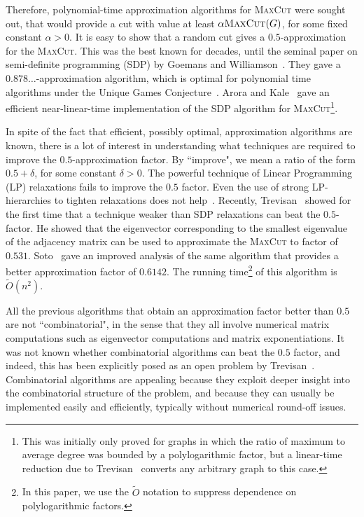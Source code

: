 \documentclass[11pt]{article}
\newcommand\otilde{\widetilde{O}}
\def\maxcut{\textsc{MaxCut}\xspace}
\begin{document}
Therefore, polynomial-time approximation algorithms for \maxcut were sought out, that would provide a cut with value at least $\alpha \maxcut(G)$,
for some fixed constant $\alpha > 0$. It is easy to show that a random cut
gives a $0.5$-approximation for the \maxcut. This was the best known
for decades, until the seminal paper on semi-definite programming (SDP) by Goemans and Williamson~\cite{GW95}. They gave a $0.878\ldots$-approximation algorithm, which is optimal for polynomial time algorithms under the Unique Games Conjecture~\cite{Kho02,KKMO04}. Arora and Kale~\cite{AK07} gave an efficient near-linear-time implementation of the SDP algorithm for \maxcut\footnote{This was initially only proved for graphs in which the ratio of maximum to average degree was bounded by a polylogarithmic factor, but a linear-time reduction due to Trevisan~\cite{Tre09} converts any arbitrary graph to this case.}.

In spite of the fact that efficient, possibly optimal, approximation algorithms are known, there is a lot of interest in understanding what techniques are required to improve the $0.5$-approximation factor. By ``improve", we mean a ratio of the form $0.5+\delta$, for some constant $\delta > 0$. The powerful technique of Linear Programming (LP) relaxations fails to improve the $0.5$ factor. Even the use of strong LP-hierarchies to tighten relaxations does not help~\cite{dlVKM07,STT07}. Recently, Trevisan~\cite{Tre09} showed for the first time that a technique weaker than SDP relaxations can beat the $0.5$-factor. He showed that the eigenvector corresponding to the smallest eigenvalue of the adjacency matrix can be used to approximate the \maxcut to factor of $0.531$.
Soto~\cite{Sot09} gave an improved analysis of the same algorithm that provides a better approximation factor of $0.6142$. The running time\footnote{In this paper, we use the $\otilde$ notation to suppress dependence on polylogarithmic factors.} of this algorithm is $\otilde(n^2)$.

All the previous algorithms that obtain an approximation factor better than $0.5$ are not ``combinatorial", in the sense that they all involve numerical matrix computations such as eigenvector computations and matrix exponentiations. It was not known whether combinatorial algorithms can beat the $0.5$ factor, and indeed, this has been explicitly posed as an open problem
by Trevisan~\cite{Tre09}. Combinatorial algorithms are appealing because they exploit deeper insight into the combinatorial structure of the problem, and because they can usually be implemented easily and efficiently, typically without numerical round-off issues.
\end{document}

